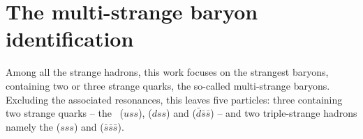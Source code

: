 %

\section{The multi-strange baryon identification}
\label{sec:HyperonId}

Among all the strange hadrons, this work focuses on the strangest baryons, containing two or three strange quarks, the so-called multi-strange baryons. Excluding the associated resonances, this leaves five particles: three containing two strange quarks -- the \rmXiZero\ ($uss$), \rmXiM ($dss$) and \rmAxiP ($\bar{d}\bar{s}\bar{s}$) -- and two triple-strange hadrons namely the \rmOmegaM ($sss$) and \rmAomegaP ($\bar{s}\bar{s}\bar{s}$).

